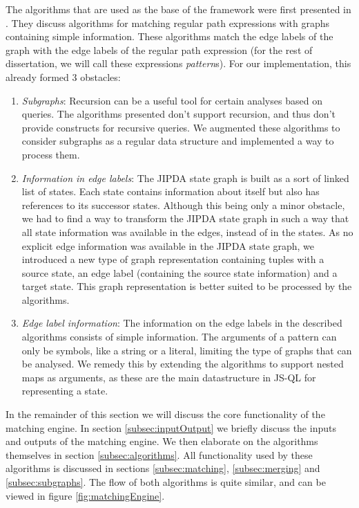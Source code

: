 The algorithms that are used as the base of the framework were first presented in \cite{algoEngine}. They discuss algorithms for matching regular path expressions with graphs containing simple information. These algorithms match the edge labels of the graph with the edge labels of the regular path expression (for the rest of dissertation, we will call these expressions \textit{pattern}s). For our implementation, this already formed 3 obstacles:
\begin{enumerate}
\item \textit{Subgraphs}: Recursion can be a useful tool for certain analyses based on queries. The algorithms presented don't support recursion, and thus don't provide constructs for recursive queries. We augmented these algorithms to consider subgraphs as a regular data structure and implemented a way to process them.
\item \textit{Information in edge labels}: The JIPDA state graph is built as a sort of linked list of states. Each state contains information about itself but also has references to its successor states. Although this being only a minor obstacle, we had to find a way to transform the JIPDA state graph in such a way that all state information was available in the edges, instead of in the states. As no explicit edge information was available in the JIPDA state graph, we introduced a new type of graph representation containing tuples with a source state, an edge label (containing the source state information) and a target state. This graph representation is better suited to be processed by the algorithms.
\item \textit{Edge label information}: The information on the edge labels in the described algorithms consists of simple information. The arguments of a pattern can only be symbols, like a string or a literal, limiting the type of graphs that can be analysed. We remedy this by extending the algorithms to support nested maps as arguments, as these are the main datastructure in JS-QL for representing a state.
\end{enumerate}


In the remainder of this section we will discuss the core functionality of the matching engine. In section \ref{subsec:inputOutput} we briefly discuss the inputs and outputs of the matching engine. We then elaborate on the algorithms themselves in section \ref{subsec:algorithms}. All functionality used by these algorithms is discussed in sections \ref{subsec:matching}, \ref{subsec:merging} and \ref{subsec:subgraphs}. The flow of both algorithms is quite similar, and can be viewed in figure \ref{fig:matchingEngine}.


